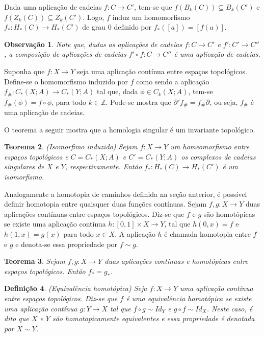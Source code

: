 \documentclass[12pt]{book}
\newtheorem{teorema}{Teorema}[section]
\newtheorem{definicao}[teorema]{Definição}
\newtheorem{observacao}[teorema]{Observação}
\newcommand{\bordo}[1]{\partial_{#1}}
\newcommand{\cadeia}[2]{C_{#1}(#2; A)}
\newcommand{\classe}[1]{[#1]}
\newcommand{\homologiaabrev}[2]{H_{#1}(#2)}
\newcommand{\imagembordoabrev}[2]{B_{#1}(#2)}
\newcommand{\induzida}[1]{#1_{\#}}
\newcommand{\inteiros}{\mathbb{Z}}
\newcommand{\intervalo}{[0,1]}
\newcommand{\kernelbordoabrev}[2]{Z_{#1}(#2)}
\begin{document}
	Dada uma aplicação de cadeias $f:C\to C'$, tem-se que $f(\imagembordoabrev{k}{C})\subseteq \imagembordoabrev{k}{C'}$ e $f(\kernelbordoabrev{k}{C})\subseteq \kernelbordoabrev{k}{C'}$. Logo, $f$ induz um homomorfismo $f_{*}:\homologiaabrev{*}{C}  \to \homologiaabrev{*}{C'}$ de grau 0 definido por $f_{*}(\classe{a}) = \classe{f(a)}$.
	
	\begin{observacao}
		Note que, dadas as aplicações de cadeias $f:C\to C'$ e $f':C'\to C''$, a composição de aplicações de cadeias $f'\circ f:C\to C''$ é uma aplicação de cadeias.
	\end{observacao}
	
	Suponha que $f:X\to Y$ seja uma aplicação contínua entre espaços topológicos. Define-se o homomorfismo induzido por $f$ como sendo a aplicação $\induzida{f}:\cadeia{*}{X}\to \cadeia{*}{Y}$ tal que, dada $\phi \in \cadeia{k}{X}$, tem-se $\induzida{f}(\phi) = f\circ \phi$, para todo $k \in \inteiros$. Pode-se mostra que $\bordo{}'\induzida{f}=\induzida{f}\bordo{}$, ou seja, $\induzida{f}$ é uma aplicação de cadeias.
	
	O teorema a seguir mostra que a homologia singular é um invariante topológico.
	
	\begin{teorema}
		(Isomorfimo induzido) Sejam $f:X \to Y$ um homeomorfismo entre espaços topológicos e $C = \cadeia{*}{X}$ e $C'=\cadeia{*}{Y}$ os complexos de cadeias singulares de $X$ e $Y$, respectivamente. Então $f_{*}: \homologiaabrev{*}{C} \to \homologiaabrev{*}{C'}$ é um isomorfismo.
	\end{teorema}
	
	Analogamente a homotopia de caminhos definida na seção anterior, é possível definir homotopia entre quaisquer duas funções contínuas. Sejam $f, g: X\to Y$ duas aplicações contínuas entre espaços topológicos. Diz-se que $f$ e $g$ são homotópicas se existe uma aplicação contínua $h:\intervalo\times X \to Y$, tal que $h(0, x) = f$ e $h(1, x) = g(x)$ para todo $x\in X$. A aplicação $h$ é chamada homotopia entre $f$ e $g$ e denota-se essa propriedade por $f\sim g$.
	
	\begin{teorema}
		Sejam $f, g: X\to Y$ duas aplicações contínuas e homotópicas entre espaços topológicos. Então $f_{*}=g_{*}$.
	\end{teorema}
	
	\begin{definicao}
		(Equivalência homotópica) Seja $f:X\to Y$ uma aplicação contínua entre espaços topológicos. Diz-se que $f$ é uma equivalência homotópica se existe uma aplicação contínua $g:Y \to X$ tal que $f\circ g \sim Id_{Y}$ e $g\circ f \sim Id_{X}$. Neste caso, é dito que $X$ e $Y$ são homotopicamente equivalentes e essa propriedade é denotada por $X\sim Y$.
	\end{definicao}
	
\end{document}

